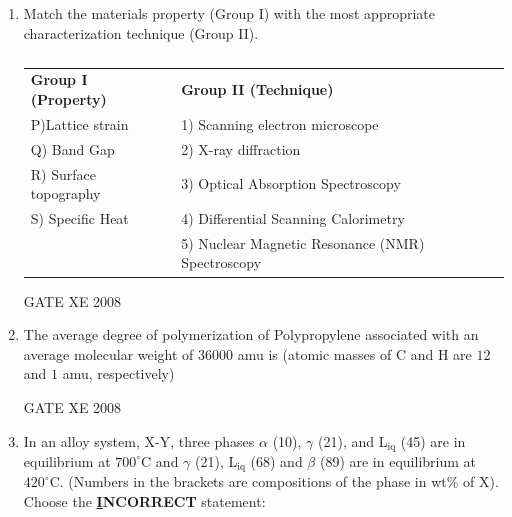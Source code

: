 \documentclass[12pt]{article}
\begin{document}
\begin{enumerate}[label=Q\arabic*.]
\item Match the materials property (Group I) with the most appropriate characterization technique (Group II).  

\begin{table}[H]     \centering     \caption{}     \label{}     \begin{tabular}{l l}
\textbf{Group I (Property)} & \textbf{Group II (Technique)}  \\
P)Lattice strain & 1) Scanning electron microscope  \\
Q) Band Gap & 2) X-ray diffraction  \\
R) Surface topography & 3) Optical Absorption Spectroscopy \\ 
S) Specific Heat &4) Differential Scanning Calorimetry  \\
   & 5) Nuclear Magnetic Resonance (NMR) Spectroscopy  
\end{tabular} \end{table}
\begin{enumerate}[label=(\Alph*)]
\end{enumerate}
GATE XE 2008

\item The average degree of polymerization of Polypropylene associated with an average molecular weight of $36000$ amu is (atomic masses of C and H are $12$ and $1$ amu, respectively)  

\begin{enumerate}[label=(\Alph*)]
\end{enumerate}

 GATE XE 2008

\item In an alloy system, X-Y, three phases $\alpha$ (10), $\gamma$ (21), and L$_{\text{iq}}$ (45) are in equilibrium at $700^\circ$C and $\gamma$ (21), L$_{\text{iq}}$ (68) and $\beta$ (89) are in equilibrium at $420^\circ$C. (Numbers in the brackets are compositions of the phase in wt\% of X). Choose the \textbf{\underline INCORRECT} statement:  


\end{enumerate}
\end{document}
